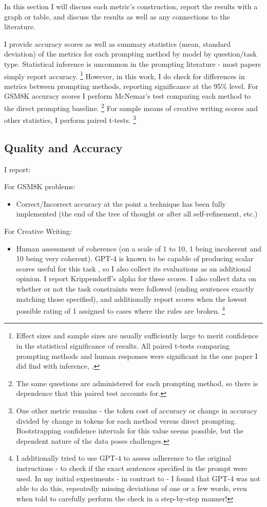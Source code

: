 \documentclass[11pt]{article}
\begin{document}
In this section I will discuss each metric's construction, report the results with a graph or table, and discuss the results as well as any connections to the literature.

I provide accuracy scores as well as summary statistics (mean, standard deviation) of the metrics for each prompting method by model by question/task type. Statistical inference is uncommon in the prompting literature - most papers simply report accuracy. \footnote{Effect sizes and sample sizes are usually sufficiently large to merit confidence in the statistical significance of results. All paired t-tests comparing prompting methods and human responses were significant in the one paper I did find with inference, \citealp{pu_chatgpt_2023}.} However, in this work, I do check for differences in metrics between prompting methods, reporting significance at the 95\% level. For GSM8K accuracy scores I perform McNemar's test comparing each method to the direct prompting baseline. \footnote{The same questions are administered for each prompting method, so there is dependence that this paired test accounts for.} For sample means of creative writing scores and other statistics, I perform paired t-tests. \footnote{One other metric remains - the token cost of accuracy or change in accuracy divided by change in tokens for each method versus direct prompting. Bootstrapping confidence intervals for this value seems possible, but the dependent nature of the data poses challenges.}

\subsection*{Quality and Accuracy}

I report:

For GSM8K problems:
\begin{itemize}
  \item Correct/Incorrect accuracy at the point a technique has been fully implemented (the end of the tree of thought or after all self-refinement, etc.)
\end{itemize}

For Creative Writing:
\begin{itemize}
  \item Human assessment of coherence (on a scale of 1 to 10, 1 being incoherent and 10 being very coherent). GPT-4 is known to be capable of producing scalar scores useful for this task \cite{yao_tree_2023}, so I also collect its evaluations as an additional opinion. I report Krippendorff's alpha for these scores. I also collect data on whether or not the task constraints were followed (ending sentences exactly matching those specified), and additionally report scores when the lowest possible rating of 1 assigned to cases where the rules are broken. \footnote{I additionally tried to use GPT-4 to assess adherence to the original instructions - to check if the exact sentences specified in the prompt were used. In my initial experiments - in contrast to \citealp{yao_tree_2023} - I found that GPT-4 was not able to do this, repeatedly missing deviations of one or a few words, even when told to carefully perform the check in a step-by-step manner!}
\end{itemize}
\end{document}
